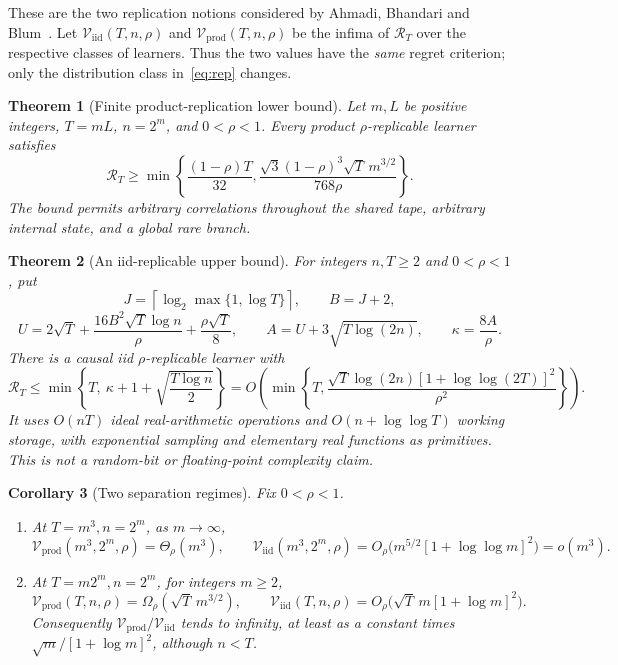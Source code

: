 \documentclass[11pt]{article}
\newtheorem{theorem}{Theorem}
\newtheorem{corollary}[theorem]{Corollary}
\newcommand{\1}{\mathbf 1}
\newcommand{\iid}{\mathrm{iid}}
\newcommand{\prodclass}{\mathrm{prod}}
\newcommand{\calV}{\mathcal V}
\begin{document}
These are the two replication notions considered by
Ahmadi, Bhandari and Blum~\cite{ABB}.
Let $\calV_{\iid}(T,n,\rho)$ and $\calV_{\prodclass}(T,n,\rho)$ be the
infima of $\mathcal R_T$ over the respective classes of learners.
Thus the two values have the \emph{same} regret criterion;
only the distribution class in~\eqref{eq:rep} changes.

\begin{theorem}[Finite product-replication lower bound]\label{thm:lower}
Let $m,L$ be positive integers, $T=mL$, $n=2^m$, and $0<\rho<1$.
Every product $\rho$-replicable learner satisfies
\begin{equation}\label{eq:lower}
 \mathcal R_T\ge
 \min\left\{\frac{(1-\rho)T}{32},
 \frac{\sqrt3(1-\rho)^3\sqrt T\,m^{3/2}}{768\rho}\right\}.
\end{equation}
The bound permits arbitrary correlations throughout the shared tape,
arbitrary internal state, and a global rare branch.
\end{theorem}

\begin{theorem}[An iid-replicable upper bound]\label{thm:upper}
For integers $n,T\ge2$ and $0<\rho<1$, put
\[
 J=\left\lceil\log_2\max\{1,\log T\}\right\rceil,\qquad B=J+2,
\]
\[
 U=2\sqrt T+\frac{16B^2\sqrt T\log n}{\rho}
          +\frac{\rho\sqrt T}{8},\qquad
 A=U+3\sqrt{T\log(2n)},\qquad \kappa=\frac{8A}{\rho}.
\]
There is a causal iid $\rho$-replicable learner with
\begin{equation}\label{eq:upper}
 \mathcal R_T\le
 \min\left\{T,\ \kappa+1+\sqrt{\frac{T\log n}{2}}\right\}
 =O\!\left(\min\left\{T,
 \frac{\sqrt T\log(2n)[1+\log\log(2T)]^2}{\rho^2}\right\}\right).
\end{equation}
It uses $O(nT)$ ideal real-arithmetic operations and
$O(n+\log\log T)$ working storage, with exponential sampling and
elementary real functions as primitives. This is not a random-bit
or floating-point complexity claim.
\end{theorem}

\begin{corollary}[Two separation regimes]\label{cor:separation}
Fix $0<\rho<1$.
\begin{enumerate}
\item At $T=m^3,n=2^m$, as $m\to\infty$,
\[
 \calV_{\prodclass}(m^3,2^m,\rho)=\Theta_\rho(m^3),\qquad
 \calV_{\iid}(m^3,2^m,\rho)
 =O_\rho\bigl(m^{5/2}[1+\log\log m]^2\bigr)=o(m^3).
\]
\item At $T=m2^m,n=2^m$, for integers $m\ge2$,
\[
 \calV_{\prodclass}(T,n,\rho)=\Omega_\rho(\sqrt T\,m^{3/2}),\qquad
 \calV_{\iid}(T,n,\rho)
 =O_\rho\bigl(\sqrt T\,m[1+\log m]^2\bigr).
\]
Consequently $\calV_{\prodclass}/\calV_{\iid}$ tends to infinity,
at least as a constant times $\sqrt m/[1+\log m]^2$, although $n<T$.
\end{enumerate}
\end{corollary}
\end{document}
